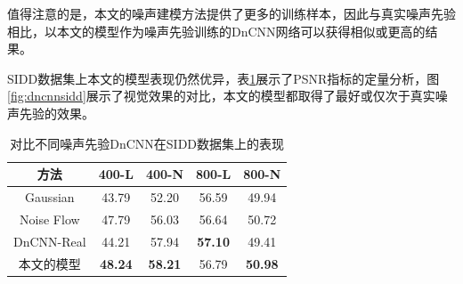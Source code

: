 \begin{table}[h]
	\begin{subtable}{\linewidth}
		\centering
		\caption{SSIM}
	\end{subtable}
	
\end{table}

值得注意的是，本文的噪声建模方法提供了更多的训练样本，因此与真实噪声先验相比，以本文的模型作为噪声先验训练的DnCNN网络可以获得相似或更高的结果。

SIDD数据集上本文的模型表现仍然优异，表\ref{dncnnsidd}展示了PSNR指标的定量分析，图\ref{fig:dncnnsidd}展示了视觉效果的对比，本文的模型都取得了最好或仅次于真实噪声先验的效果。

\begin{table}[htbp]
	\begin{center}
		
		\caption{对比不同噪声先验DnCNN在SIDD数据集上的表现}
		\label{dncnnsidd}
		\begin{tabular}{c|cccc}
			\toprule[1.5pt]
			方法 & 400-L & 400-N & 800-L & 800-N \\
			\midrule[1pt]
			Gaussian & 43.79 & 52.20 & 56.59 & 49.94 \\
			Noise Flow\cite{noiseflow} & 47.79 & 56.03 & 56.64 & 50.72 \\
			DnCNN-Real & 44.21 & 57.94 & \textbf{57.10} & 49.41 \\
			\midrule[1pt]
			本文的模型 & \textbf{48.24} & \textbf{58.21} & 56.79 & \textbf{50.98} \\
			\bottomrule[1.5pt]
		\end{tabular}
	\end{center}
\end{table}

